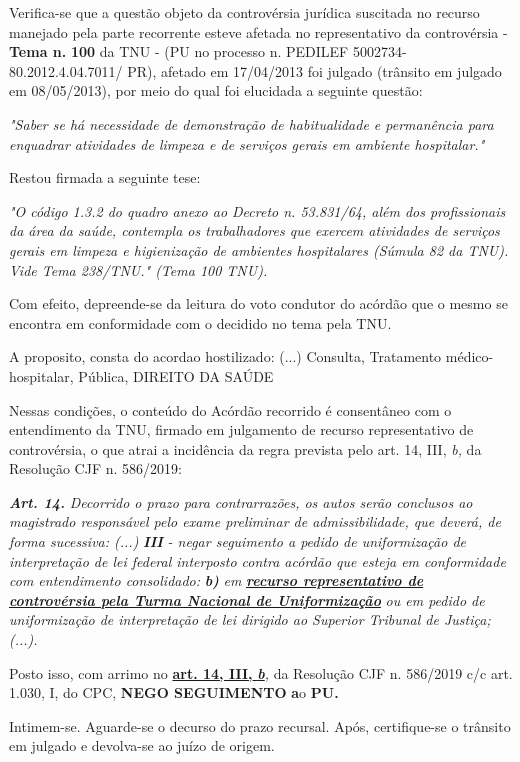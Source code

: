 \documentclass[12pt]{article}
\begin{document}
\justifying
\noindent Verifica-se que a questão objeto da controvérsia jurídica suscitada no recurso manejado pela parte recorrente esteve afetada no representativo da controvérsia - \textbf{Tema n. }\textbf{100} da TNU - (PU no processo n. PEDILEF 5002734-80.2012.4.04.7011/ PR),  afetado em 17/04/2013 foi julgado (trânsito em julgado em 08/05/2013), por meio do qual foi elucidada a seguinte questão:

\noindent \textit{"Saber se há necessidade de demonstração de habitualidade e permanência para enquadrar atividades de limpeza e de serviços gerais em ambiente hospitalar."}

\noindent Restou firmada a seguinte tese:

\noindent \textit{"O código 1.3.2 do quadro anexo ao Decreto n. 53.831/64, além dos profissionais da área da saúde, contempla os trabalhadores que exercem atividades de serviços gerais em limpeza e higienização de ambientes hospitalares (Súmula 82 da TNU). Vide Tema 238/TNU." (Tema 100 TNU).}

\noindent Com efeito, depreende-se da leitura do voto condutor do acórdão que o mesmo se encontra em conformidade com o decidido no  tema pela TNU.

\noindent A proposito, consta do acordao hostilizado: (...) Consulta, Tratamento médico-hospitalar, Pública, DIREITO DA SAÚDE

\noindent Nessas condições, o conteúdo do Acórdão recorrido é consentâneo com o entendimento da TNU, firmado em julgamento de recurso representativo de controvérsia, o que atrai a incidência da regra prevista pelo art. 14, III, \textit{b,} da Resolução CJF n. 586/2019:

\noindent \textit{\textbf{Art. 14.}}\textit{ Decorrido o prazo para contrarrazões, os autos serão conclusos ao magistrado responsável pelo exame preliminar de admissibilidade, que deverá, de forma sucessiva: (...) }\textit{\textbf{III }}\textit{- negar seguimento a pedido de uniformização de interpretação de lei federal interposto contra acórdão que esteja em conformidade com entendimento consolidado: }\textit{\textbf{b)}}\textit{ em }\uline{\textit{\textbf{recurso representativo de controvérsia pela Turma Nacional de Uniformização}}}\textit{ ou em pedido de uniformização de interpretação de lei dirigido ao Superior Tribunal de Justiça;(...).}

\noindent Posto isso, com arrimo no \uline{\textbf{art. 14, III, }}\uline{\textit{\textbf{b}}}\textit{,} da Resolução CJF n. 586/2019 c/c art. 1.030, I, do CPC, \textbf{NEGO SEGUIMENTO }\textbf{a}o\textbf{ PU}\textbf{.}

\noindent Intimem-se. Aguarde-se o decurso do prazo recursal. Após, certifique-se o trânsito em julgado e devolva-se ao juízo de origem.
\end{document}
